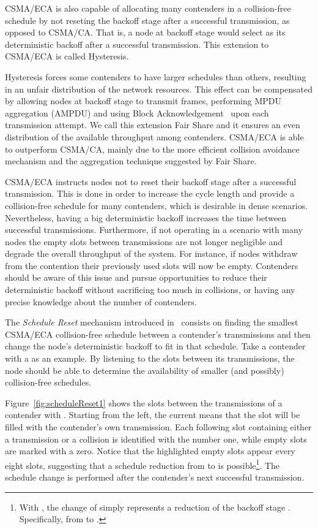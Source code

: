 \documentclass[a4paper]{article}
\begin{document}
CSMA/ECA is also capable of allocating many contenders in a collision-free schedule by not reseting the backoff stage  after a successful transmission, as opposed to CSMA/CA. That is, a node at backoff stage  would select  as its deterministic backoff after a successful transmission. This extension to CSMA/ECA is called Hysteresis. 

Hysteresis forces some contenders to have larger schedules than others, resulting in an unfair distribution of the network resources. This effect can be compensated by allowing nodes at backoff stage  to transmit  frames, performing MPDU aggregation (AMPDU) and using Block Acknowledgement~\cite{perahia2013next} upon each transmission attempt. We call this extension Fair Share and it ensures an even distribution of the available throughput among contenders. CSMA/ECA is able to outperform CSMA/CA, mainly due to the more efficient collision avoidance mechanism and the aggregation technique suggested by Fair Share.

CSMA/ECA instructs nodes not to reset their backoff stage after a successful transmission. This is done in order to increase the cycle length and provide a collision-free schedule for many contenders, which is desirable in dense scenarios. Nevertheless, having a big deterministic backoff increases the time between successful transmissions. Furthermore, if not operating in a scenario with many nodes the empty slots between transmissions are not longer negligible and degrade the overall throughput of the system. For instance, if nodes withdraw from the contention their previously used slots will now be empty. Contenders should be aware of this issue and pursue opportunities to reduce their deterministic backoff without sacrificing too much in collisions, or having any precise knowledge about the number of contenders. 


The \emph{Schedule Reset} mechanism introduced in~\cite{sanabria2014high} consists on finding the smallest CSMA/ECA collision-free schedule between a contender's transmissions and then change the node's deterministic backoff to fit in that schedule. Take a contender with a  as an example. By listening to the slots between its transmissions, the node should be able to determine the availability of smaller (and possibly) collision-free schedules. 

Figure~\ref{fig:scheduleReset1} shows the slots between the transmissions of a contender with . Starting from the left, the current  means that the slot will be filled with the contender's own transmission. Each following slot containing either a transmission or a collision is identified with the number one, while empty slots are marked with a zero. Notice that the highlighted empty slots appear every eight slots, suggesting that a schedule reduction from  to  is possible\footnote{With , the change of  simply represents a reduction of the backoff stage . Specifically, from  to .}. The schedule change is performed after the contender's next successful transmission. 
\end{document}
